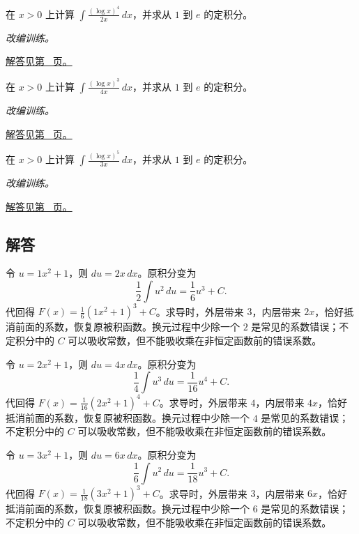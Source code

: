 \documentclass[UTF8,12pt,a4paper,fontset=fandol]{ctexart}
\begin{document}
\begin{example}[对数幂与变量范围]\label{ex:c12q22}
在 $x>0$ 上计算 $\displaystyle\int\frac{(\log x)^{4}}{2x}\,dx$，并求从 $1$ 到 $e$ 的定积分。
\par\textit{改编训练。}\par\hyperref[ans:c12q22]{解答见第~\pageref{ans:c12q22} 页。}
\end{example}
\begin{example}[对数幂与变量范围]\label{ex:c12q23}
在 $x>0$ 上计算 $\displaystyle\int\frac{(\log x)^{3}}{4x}\,dx$，并求从 $1$ 到 $e$ 的定积分。
\par\textit{改编训练。}\par\hyperref[ans:c12q23]{解答见第~\pageref{ans:c12q23} 页。}
\end{example}
\begin{example}[对数幂与变量范围]\label{ex:c12q24}
在 $x>0$ 上计算 $\displaystyle\int\frac{(\log x)^{5}}{3x}\,dx$，并求从 $1$ 到 $e$ 的定积分。
\par\textit{改编训练。}\par\hyperref[ans:c12q24]{解答见第~\pageref{ans:c12q24} 页。}
\end{example}
\subsection{解答}
\begin{solve}\label{ans:c12q1}
令 $u=1x^2+1$，则 $du=2x\,dx$。原积分变为
\[
\frac1{2}\int u^{2}\,du=\frac{1}{6}u^{3}+C.
\]
代回得 $F(x)=\frac{1}{6}(1x^2+1)^{3}+C$。求导时，外层带来 $3$，内层带来 $2x$，恰好抵消前面的系数，恢复原被积函数。换元过程中少除一个 $2$ 是常见的系数错误；不定积分中的 $C$ 可以吸收常数，但不能吸收乘在非恒定函数前的错误系数。
\end{solve}

\begin{solve}\label{ans:c12q2}
令 $u=2x^2+1$，则 $du=4x\,dx$。原积分变为
\[
\frac1{4}\int u^{3}\,du=\frac{1}{16}u^{4}+C.
\]
代回得 $F(x)=\frac{1}{16}(2x^2+1)^{4}+C$。求导时，外层带来 $4$，内层带来 $4x$，恰好抵消前面的系数，恢复原被积函数。换元过程中少除一个 $4$ 是常见的系数错误；不定积分中的 $C$ 可以吸收常数，但不能吸收乘在非恒定函数前的错误系数。
\end{solve}

\begin{solve}\label{ans:c12q3}
令 $u=3x^2+1$，则 $du=6x\,dx$。原积分变为
\[
\frac1{6}\int u^{2}\,du=\frac{1}{18}u^{3}+C.
\]
代回得 $F(x)=\frac{1}{18}(3x^2+1)^{3}+C$。求导时，外层带来 $3$，内层带来 $6x$，恰好抵消前面的系数，恢复原被积函数。换元过程中少除一个 $6$ 是常见的系数错误；不定积分中的 $C$ 可以吸收常数，但不能吸收乘在非恒定函数前的错误系数。
\end{solve}
\end{document}
